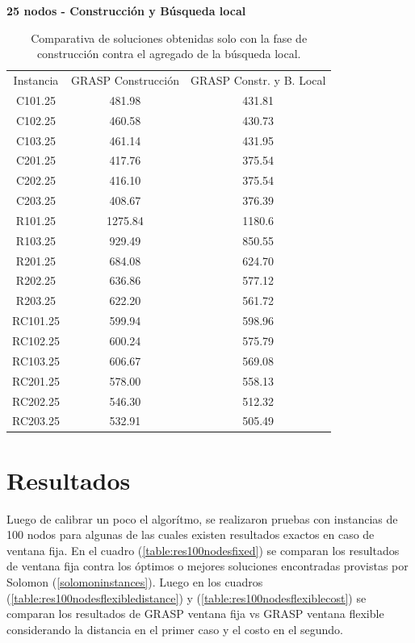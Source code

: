 \documentclass{article}
\begin{document}
  \begin{table}[h!]
    \centering
    \caption*{{\bf 25 nodos - Construcción y Búsqueda local}}
    \begin{tabular}{ccc}
      \toprule
      Instancia & GRASP Construcción & GRASP Constr. y B. Local \\
      C101.25  &  481.98 & 431.81 \\
      C102.25  &  460.58 & 430.73 \\
      C103.25  &  461.14 & 431.95 \\
      C201.25  &  417.76 & 375.54 \\
      C202.25  &  416.10 & 375.54 \\
      C203.25  &  408.67 & 376.39 \\
      R101.25  & 1275.84 & 1180.6 \\
      R103.25  &  929.49 & 850.55 \\
      R201.25  &  684.08 & 624.70 \\
      R202.25  &  636.86 & 577.12 \\
      R203.25  &  622.20 & 561.72 \\
      RC101.25 &  599.94 & 598.96 \\
      RC102.25 &  600.24 & 575.79 \\
      RC103.25 &  606.67 & 569.08 \\
      RC201.25 &  578.00 & 558.13 \\
      RC202.25 &  546.30 & 512.32 \\
      RC203.25 &  532.91 & 505.49 \\
      
      \midrule
      \bottomrule
    \end{tabular}
    \caption{Comparativa de soluciones obtenidas solo con la fase de construcción contra el agregado de la búsqueda local.}\label{table:constructionandlocalsearch}
  \end{table}

  \section*{Resultados}

  Luego de calibrar un poco el algorítmo, se realizaron pruebas con instancias de 100 nodos para algunas de las cuales existen resultados exactos en caso de ventana fija. En el cuadro (\ref{table:res100nodesfixed}) se comparan los resultados de ventana fija contra los óptimos o mejores soluciones encontradas provistas por Solomon (\ref{solomoninstances}). Luego en los cuadros (\ref{table:res100nodesflexibledistance}) y (\ref{table:res100nodesflexiblecost}) se comparan los resultados de GRASP ventana fija vs GRASP ventana flexible considerando la distancia en el primer caso y el costo en el segundo.
  
\end{document}
